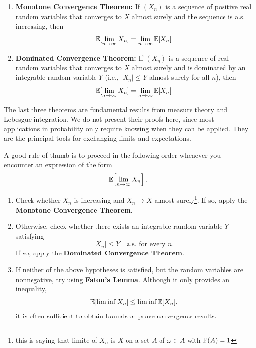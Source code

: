\documentclass[../Main.tex]{subfiles}
\begin{document}
\begin{enumerate}
    \item \textbf{Monotone Convergence Theorem:}
    If \( (X_n) \) is a sequence of positive real random variables that converges to \(X\) almost surely and the sequence is a.s. increasing, then
    \begin{equation*}
    \mathbb{E}[\lim_{n \to \infty} X_n] = \lim_{n \to \infty} \mathbb{E}[X_n]
    \end{equation*}

    \item \textbf{Dominated Convergence Theorem:}
    If \( (X_n) \) is a sequence of real random variables that converges to \( X\) almost surely and is dominated by an integrable random variable \( Y \) (i.e., \( |X_n| \leq Y \) almost surely for all \( n \)), then
    \begin{equation*}
    \mathbb{E}[\lim_{n \to \infty} X_n] = \lim_{n \to \infty} \mathbb{E}[X_n]
    \end{equation*}
\end{enumerate}

The last three theorems are fundamental results from measure theory and
Lebesgue integration. We do not present their proofs here, since most
applications in probability only require knowing when they can be applied.
They are the principal tools for exchanging limits and expectations.

A good rule of thumb is to proceed in the following order whenever you
encounter an expression of the form
\[ \mathbb{E}\!\left[\lim_{n\to\infty}X_n\right]. \]

\begin{enumerate}
    \item Check whether \( X_n \) is increasing and \(X_n\rightarrow X\) almost surely\footnote{this is saying that limite of $X_n$ is $X$ on a set $A$ of $\omega\in A$ with $\mathbb{P}(A)=1$}.
    If so, apply the \textbf{Monotone Convergence Theorem}.

    \item Otherwise, check whether there exists an integrable random variable
    \(Y\) satisfying
    \[
    |X_n|\leq Y
    \quad\text{a.s. for every }n.
    \]
    If so, apply the \textbf{Dominated Convergence Theorem}.

    \item If neither of the above hypotheses is satisfied, but the random
    variables are nonnegative, try using \textbf{Fatou's Lemma}. Although it
    only provides an inequality,
    \[
    \mathbb{E}[\liminf X_n]
    \leq
    \liminf \mathbb{E}[X_n],
    \]
    it is often sufficient to obtain bounds or prove convergence results.
\end{enumerate}
\end{document}

